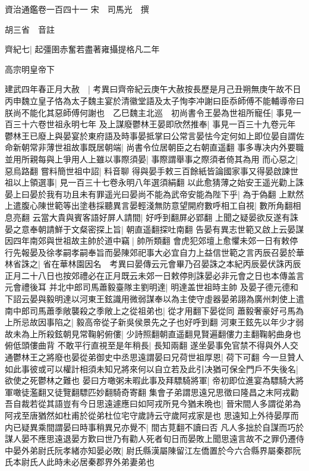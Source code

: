 資治通鑑卷一百四十一
宋　司馬光　撰

胡三省　音註

齊紀七|{
	起彊圉赤奮若盡著雍攝提格凡二年}


高宗明皇帝下

建武四年春正月大赦　|{
	考異曰齊帝紀云庚午大赦按長歷是月己丑朔無庚午故不日}
丙申魏立皇子恪為太子魏主宴於清徽堂語及太子恂李冲謝曰臣忝師傅不能輔導帝曰朕尚不能化其惡師傅何謝也　乙巳魏主北巡　初尚書令王晏為世祖所寵任|{
	事見一百三十六卷世祖永明七年}
及上謀廢鬱林王晏即欣然推奉|{
	事見一百三十九卷元年}
鬱林王已廢上與晏宴於東府語及時事晏抵掌曰公常言晏怯今定何如上即位晏自謂佐命新朝常非薄世祖故事既居朝端|{
	尚書令位居朝臣之右朝直遥翻}
事多專决内外要職並用所親每與上爭用人上雖以事際須晏|{
	事際謂舉事之際須者倚其為用}
而心惡之|{
	惡烏路翻}
嘗料簡世祖中詔|{
	料音聊}
得與晏手敕三百餘紙皆論國家事又得晏啟諫世祖以上領選事|{
	見一百三十七卷永明八年選須絹翻}
以此愈猜薄之始安王遥光勸上誅晏上曰晏於我有功且未有罪遥光曰晏尚不能為武帝安能為陛下乎|{
	為于偽翻}
上默然上遣腹心陳世範等出塗巷採聽異言晏輕淺無防意望開府數呼相工自視|{
	數所角翻相息亮翻}
云當大貴與賓客語好屏人請間|{
	好呼到翻屏必郢翻}
上聞之疑晏欲反遂有誅晏之意奉朝請鮮于文粲密探上旨|{
	朝直遥翻探吐南翻}
告晏有異志世範又啟上云晏謀因四年南郊與世祖故主帥於道中竊|{
	帥所類翻}
會虎犯郊壇上愈懼未郊一日有敕停行先報晏及徐孝嗣孝嗣奉旨而晏陳郊祀事大必宜自力上益信世範之言丙辰召晏於華林省誅之|{
	省在華林園因名　考異曰晏傳云元會畢乃召晏誅之本紀丙辰晏伏誅丙辰正月二十八日也按郊禮必在正月既云未郊一日敕停則誅晏必非元會之日也本傳盖言元會禮後耳}
并北中郎司馬蕭毅臺隊主劉明達|{
	明達盖世祖時主帥}
及晏子德元德和下詔云晏與毅明達以河東王鉉識用微弱謀奉以為主使守虛器晏弟詡為廣州刺使上遣南中郎司馬蕭季敞襲殺之季敞上之從祖弟也|{
	從才用翻下晏從同}
蕭毅奢豪好弓馬為上所忌故因事陷之|{
	毅高帝從子新吳侯景先之子也好呼到翻}
河東王鉉先以年少才弱故未為上所殺鉉朝見常鞠躬俯僂|{
	少詩照翻朝直遥翻見賢遍翻僂力主翻鞠躬曲身也俯低頭僂曲背}
不敢平行直視至是年稍長|{
	長知兩翻}
遂坐晏事免官禁不得與外人交通鬱林王之將廢也晏從弟御史中丞思遠謂晏曰兄荷世祖厚恩|{
	荷下可翻}
今一旦贊人如此事彼或可以權計相須未知兄將來何以自立若及此引决猶可保全門戶不失後名|{
	欲使之死鬱林之難也}
晏曰方噉粥未暇此事及拜驃騎將軍|{
	帝初即位進宴為驃騎大將軍噉徒濫翻又徒覽翻驃匹妙翻騎奇寄翻}
集會子弟謂思遠兄思徵曰隆昌之末阿戎勸吾自裁若從其語豈有今日思遠遽應曰如阿戎所見今猶未晩也|{
	晉宋間人多謂從弟為阿戎至唐猶然如杜甫於從弟杜位宅守歲詩云守歲阿戎家是也}
思遠知上外待晏厚而内已疑異乘間謂晏曰時事稍異兄亦覺不|{
	間古莧翻不讀曰否}
凡人多拙於自謀而巧於謀人晏不應思遠退晏方歎曰世乃有勸人死者旬日而晏敗上聞思遠言故不之罪仍遷侍中晏外弟尉氏阮孝緒亦知晏必敗|{
	尉氏縣漢屬陳留江左僑置於今六合縣界屬秦郡阮氏本尉氏人此時未必居秦郡界外弟妻弟也}
